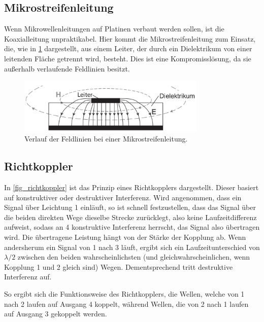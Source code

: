\documentclass[
	a4paper,
	12pt,
	pagesize,
	ngerman
]{scrartcl}
\begin{document}
	\subsection{Mikrostreifenleitung}

	Wenn Mikrowellenleitungen auf Platinen verbaut werden sollen, ist die Koaxialleitung unpraktikabel.
	Hier kommt die Mikrostreifenleitung zum Einsatz, die, wie in \cref{fig_mikrostreifen} dargestellt, aus einem Leiter, der durch ein Dielektrikum von einer leitenden Fläche getrennt wird, besteht.
	Dies ist eine Kompromisslösung, da sie außerhalb verlaufende Feldlinien besitzt.

	\begin{figure}[H]
		\includegraphics[width=0.8\textwidth]{img/mirkostreifen}
		\centering
		\caption{
			Verlauf der Feldlinien bei einer Mikrostreifenleitung. \cite{Anleitung}
		}
		\label{fig_mikrostreifen}
		\centering
	\end{figure}


	\subsection{Richtkoppler} \label{ss_richt}

	In \cref{fig_richtkoppler} ist das Prinzip eines Richtkopplers dargestellt.
	Dieser basiert auf konstruktiver oder destruktiver Interferenz.
	Wird angenommen, dass ein Signal über Leichtung 1 einläuft, so ist schnell festzustellen, dass das Signal über die beiden direkten Wege dieselbe Strecke zurücklegt, also keine Laufzeitdifferenz aufweist, sodass an 4 konstruktive Interferenz herrscht, das Signal also übertragen wird. %
	Die übertragene Leistung hängt von der Stärke der Kopplung ab.
	Wenn andersherum ein Signal von 1 nach 3 läuft, ergibt sich ein Laufzeitunterschied von $\lambda/2$ zwischen den beiden wahrscheinlichsten (und gleichwahrscheinlichen, wenn Kopplung 1 und 2 gleich sind) Wegen.
	Dementsprechend tritt destruktive Interferenz auf.

	So ergibt sich die Funktionsweise des Richtkopplers, die Wellen, welche von 1 nach 2 laufen auf Ausgang 4 koppelt, während Wellen, die von 2 nach 1 laufen auf Ausgang 3 gekoppelt werden.
\end{document}

